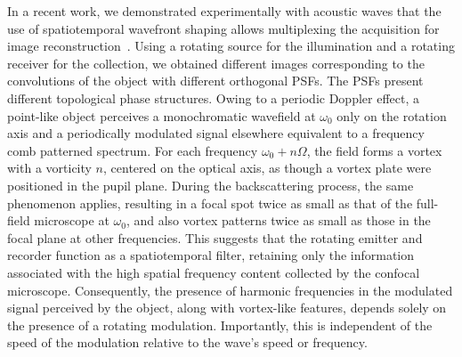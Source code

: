 \documentclass[%
reprint,
 amsmath,amssymb,
 aps,
]{revtex4-2}
\begin{document}
In a recent work, we demonstrated experimentally with acoustic waves that the use of spatiotemporal wavefront shaping allows multiplexing the acquisition for image reconstruction~\cite{PRAppliedAcoustic_Noetinger}. Using a rotating source for the illumination and a rotating receiver for the collection, we obtained different images corresponding to the convolutions of the object with different orthogonal PSFs. The PSFs present different topological phase structures. 
Owing to a periodic Doppler effect, a point-like object perceives a monochromatic wavefield at $\omega_0$ only on the rotation axis and a periodically modulated signal elsewhere equivalent to a frequency comb patterned spectrum. For each frequency $\omega_0+n\Omega$, the field forms a vortex with a vorticity $n$, centered on the optical axis, as though a vortex plate were positioned in the pupil plane. During the backscattering process, the same phenomenon applies, resulting in a focal spot twice as small as that of the full-field microscope at $\omega_0$, and also vortex patterns twice as small as those in the focal plane at other frequencies. This suggests that the rotating emitter and recorder function as a spatiotemporal filter, retaining only the information associated with the high spatial frequency content collected by the confocal microscope. 
Consequently, the presence of harmonic frequencies in the modulated signal perceived by the object, along with vortex-like features, depends solely on the presence of a rotating modulation. Importantly, this is independent of the speed of the modulation relative to the wave's speed or frequency.
\end{document}
